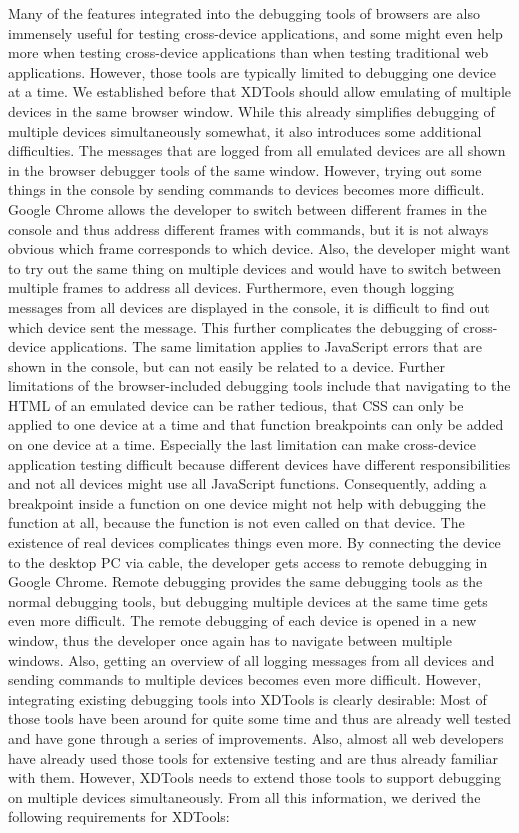 Many of the features integrated into the debugging tools of browsers are also immensely useful for testing cross-device applications, and some might even help more when testing cross-device applications than when testing traditional web applications. However, those tools are typically limited to debugging one device at a time. We established before that XDTools should allow emulating of multiple devices in the same browser window. While this already simplifies debugging of multiple devices simultaneously somewhat, it also introduces some additional difficulties. The messages that are logged from all emulated devices are all shown in the browser debugger tools of the same window. However, trying out some things in the console by sending commands to devices becomes more difficult. Google Chrome allows the developer to switch between different frames in the console and thus address different frames with commands, but it is not always obvious which frame corresponds to which device. Also, the developer might want to try out the same thing on multiple devices and would have to switch between multiple frames to address all devices. Furthermore, even though logging messages from all devices are displayed in the console, it is difficult to find out which device sent the message. This further complicates the debugging of cross-device applications. The same limitation applies to JavaScript errors that are shown in the console, but can not easily be related to a device. Further limitations of the browser-included debugging tools include that navigating to the HTML of an emulated device can be rather tedious, that CSS can only be applied to one device at a time and that function breakpoints can only be added on one device at a time. Especially the last limitation can make cross-device application testing difficult because different devices have different responsibilities and not all devices might use all JavaScript functions. Consequently, adding a breakpoint inside a function on one device might not help with debugging the function at all, because the function is not even called on that device. The existence of real devices complicates things even more. By connecting the device to the desktop PC via cable, the developer gets access to remote debugging in Google Chrome. Remote debugging provides the same debugging tools as the normal debugging tools, but debugging multiple devices at the same time gets even more difficult. The remote debugging of each device is opened in a new window, thus the developer once again has to navigate between multiple windows. Also, getting an overview of all logging messages from all devices and sending commands to multiple devices becomes even more difficult. However, integrating existing debugging tools into XDTools is clearly desirable: Most of those tools have been around for quite some time and thus are already well tested and have gone through a series of improvements. Also, almost all web developers have already used those tools for extensive testing and are thus already familiar with them. However, XDTools needs to extend those tools to support debugging on multiple devices simultaneously. From all this information, we derived the following requirements for XDTools:
